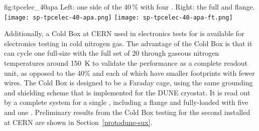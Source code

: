 {\begin{dunefigure}
{fig:tpcelec_40apa}
{Left: one side of the \num{40}\,\%  with four .  Right: the full  \fdth and flange.}
\texttt{[image: sp-tpcelec-40-apa.png]}
\hspace{3mm}
\texttt{[image: sp-tpcelec-40-apa-ft.png]}
\end{dunefigure}



Additionally, a Cold Box at CERN used in electronics tests for  is available for electronics testing 
in cold nitrogen gas. The advantage of the Cold Box is that it can cycle one full-size  with the full 
set of \num{20}  through gaseous nitrogen temperatures around \SI{150}{K} to validate the  
performance as a complete  readout unit, as opposed to the 40\%  and  each of which have smaller
 footprints with fewer wires. The Cold Box is designed to be a Faraday cage, using the same grounding 
and shielding scheme that is implemented for the DUNE \single cryostat. It is read out by a complete  
system for a single , including a  flange and fully-loaded 
 with five  and one . Preliminary results from the  Cold Box testing 
for the second  installed at CERN are shown in Section~\ref{protodune-sux}.

}
